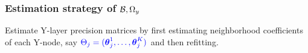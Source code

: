 \documentclass[10pt]{beamer}
\theoremstyle{definition}
\begin{document}

\begin{frame}
\frametitle{Estimation strategy of ${\cal{B}}, \Omega_y$}

Estimate Y-layer precision matrices by first estimating neighborhood coefficients of each Y-node, say ${\color{blue} \Theta_j = ({\boldsymbol{\theta}}_j^1, \ldots, {\boldsymbol{\theta}}_j^K)}$ and then refitting.

\end{frame}
\end{document}
